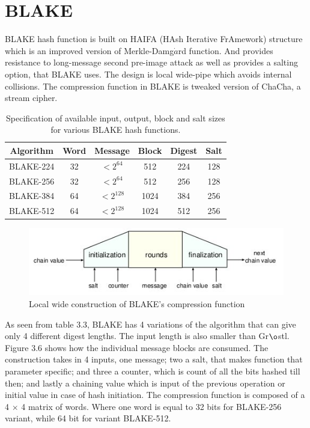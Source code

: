\section{BLAKE} 

BLAKE\cite{00002} hash function is built on HAIFA (HAsh Iterative FrAmework) structure \cite{00020} which is an improved
version of Merkle-Damg$\dot{a}$rd function. And provides resistance to long-message second pre-image attack as well as
provides a salting option, that BLAKE uses\cite{00021}.
The design is local wide-pipe which avoids internal collisions. The compression function in BLAKE is tweaked version of 
ChaCha, a stream cipher. 

\begin{table}[h]
  \begin{center}
    \begin{tabular}{ *{6}{c} } \hline
      Algorithm & Word & Message    & Block & Digest & Salt \\ \hline
      BLAKE-224 & 32   & $< 2^{64}$  & 512   & 224    & 128  \\
      BLAKE-256 & 32   & $< 2^{64}$  & 512   & 256    & 128  \\
      BLAKE-384 & 64   & $< 2^{128}$ & 1024  & 384    & 256  \\
      BLAKE-512 & 64   & $< 2^{128}$ & 1024  & 512    & 256  \\ \hline
    \end{tabular}
    \caption{Specification of available input, output, block and salt sizes for various BLAKE hash functions.}
  \end{center}
\end{table}

\begin{figure}[h]
  \begin{center}
    \includegraphics[width=4.75in]{blakelocalwidepipeconstruction.jpg}
  \end{center}
  \caption{Local wide construction of BLAKE's compression function}
  \label{fig:lab}
\end{figure}

As seen from table 3.3, BLAKE has 4 variations of the algorithm that can give only 4 different digest lengths. The input
length is also smaller than Gr$\o$stl. Figure 3.6 shows how the individual message blocks are consumed. The construction
takes in 4 inputs, one message; two a salt, that makes function that parameter specific; and three a counter, which is 
count of all the bits hashed till then; and lastly a chaining value which is input of the previous operation or initial
value in case of hash initiation. The compression function is composed of a 4 $\times$ 4 matrix of words. Where one word is 
equal to 32 bits for BLAKE-256 variant, while 64 bit for variant BLAKE-512.


